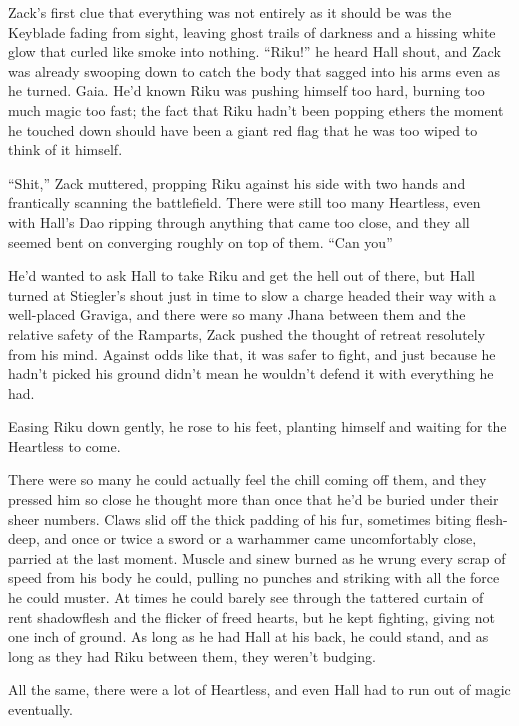 \scenechange


Zack's first clue that everything was not entirely as it should be was the Keyblade fading from sight, leaving ghost trails of darkness and a hissing white glow that curled like smoke into nothing. ``Riku!'' he heard Hall shout, and Zack was already swooping down to catch the body that sagged into his arms even as he turned. Gaia. He'd known Riku was pushing himself too hard, burning too much magic too fast; the fact that Riku hadn't been popping ethers the moment he touched down should have been a giant red flag that he was too wiped to think of it himself.

``Shit,'' Zack muttered, propping Riku against his side with two hands and frantically scanning the battlefield. There were still too many Heartless, even with Hall's Dao ripping through anything that came too close, and they all seemed bent on converging roughly on top of them. ``Can you\textemdash''

He'd wanted to ask Hall to take Riku and get the hell out of there, but Hall turned at Stiegler's shout just in time to slow a charge headed their way with a well-placed Graviga, and there were so many Jhana between them and the relative safety of the Ramparts, Zack pushed the thought of retreat resolutely from his mind. Against odds like that, it was safer to fight, and just because he hadn't picked his ground didn't mean he wouldn't defend it with everything he had.

Easing Riku down gently, he rose to his feet, planting himself and waiting for the Heartless to come.

There were so many he could actually feel the chill coming off them, and they pressed him so close he thought more than once that he'd be buried under their sheer numbers. Claws slid off the thick padding of his fur, sometimes biting flesh-deep, and once or twice a sword or a warhammer came uncomfortably close, parried at the last moment. Muscle and sinew burned as he wrung every scrap of speed from his body he could, pulling no punches and striking with all the force he could muster. At times he could barely see through the tattered curtain of rent shadowflesh and the flicker of freed hearts, but he kept fighting, giving not one inch of ground. As long as he had Hall at his back, he could stand, and as long as they had Riku between them, they weren't budging.

All the same, there were a lot of Heartless, and even Hall had to run out of magic eventually.

